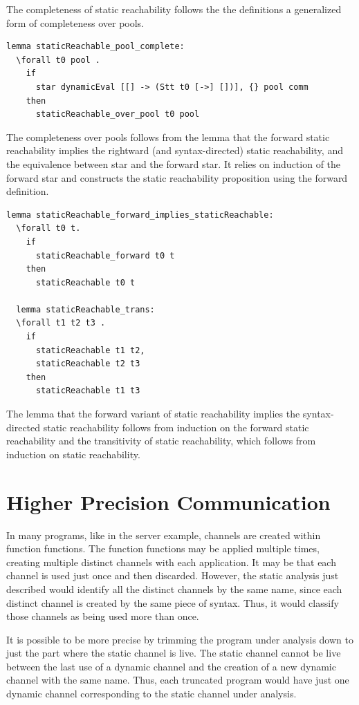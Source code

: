 \documentclass[10pt]{article}
\begin{document}
The completeness of static reachability follows the the definitions
a generalized form of completeness over pools.

\begin{lstlisting}[language=logic, mathescape]
  lemma staticReachable_pool_complete:
  \forall t0 pool .
    if
      star dynamicEval [[] -> (Stt t0 [->] [])], {} pool comm 
    then
      staticReachable_over_pool t0 pool
\end{lstlisting}

The completeness over pools follows from the lemma that the forward
static reachability implies the rightward (and syntax-directed) static reachability,
and the equivalence between star and the forward star.  It relies on induction of the
forward star and constructs the static reachability
proposition using the forward definition.  

\begin{lstlisting}[language=logic, mathescape]
  lemma staticReachable_forward_implies_staticReachable:
  \forall t0 t. 
    if
      staticReachable_forward t0 t
    then
      staticReachable t0 t

  lemma staticReachable_trans:
  \forall t1 t2 t3 .
    if 
      staticReachable t1 t2,
      staticReachable t2 t3
    then
      staticReachable t1 t3
\end{lstlisting}

The lemma that the forward variant of static reachability implies the syntax-directed static
reachability follows from induction on the forward static reachability and the
transitivity of static reachability, which follows from induction on static reachability.

\section{Higher Precision Communication}
In many programs, like in the server example, channels are created within function functions.
The function functions may be applied multiple times, creating multiple distinct channels
with each application. It may be that each channel is used just once and then discarded.
However, the static analysis just described would identify all the distinct channels by the
same name, since each distinct channel is created by the same piece of syntax.
Thus, it would classify those channels as being used more than once.

It is possible to be more precise by trimming the program under analysis down to just the part
where the static channel is live. The static channel cannot be live between the last use of a
dynamic channel and the creation of a new dynamic channel with the same name.  Thus, each
truncated program would have just one dynamic channel corresponding to the static channel under
analysis. 
\end{document}
